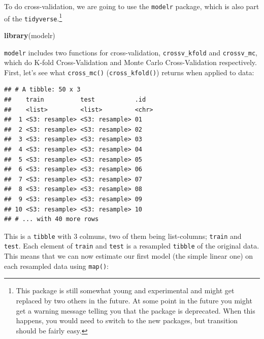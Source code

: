 \documentclass[]{gitbook}
\newenvironment{Shaded}{\begin{snugshade}}{\end{snugshade}}
\newcommand{\DataTypeTok}[1]{\textcolor[rgb]{0.13,0.29,0.53}{#1}}
\newcommand{\DecValTok}[1]{\textcolor[rgb]{0.00,0.00,0.81}{#1}}
\newcommand{\KeywordTok}[1]{\textcolor[rgb]{0.13,0.29,0.53}{\textbf{#1}}}
\newcommand{\NormalTok}[1]{#1}
\newcommand{\OperatorTok}[1]{\textcolor[rgb]{0.81,0.36,0.00}{\textbf{#1}}}
\newcommand{\StringTok}[1]{\textcolor[rgb]{0.31,0.60,0.02}{#1}}
\let\rmarkdownfootnote\footnote%
\def\footnote{\protect\rmarkdownfootnote}
\theoremstyle{definition}
\theoremstyle{definition}
\theoremstyle{definition}
\theoremstyle{remark}
\begin{document}
To do cross-validation, we are going to use the \texttt{modelr} package,
which is also part of the \texttt{tidyverse}.\footnote{This package is
  still somewhat young and experimental and might get replaced by two
  others in the future. At some point in the future you might get a
  warning message telling you that the package is deprecated. When this
  happens, you would need to switch to the new packages, but transition
  should be fairly easy.}

\begin{Shaded}
\begin{Highlighting}[]
\KeywordTok{library}\NormalTok{(modelr)}
\end{Highlighting}
\end{Shaded}

\texttt{modelr} includes two functions for cross-validation,
\texttt{crossv\_kfold} and \texttt{crossv\_mc}, which do K-fold
Cross-Validation and Monte Carlo Cross-Validation respectively. First,
let's see what \texttt{cross\_mc()} (\texttt{cross\_kfold()}) returns
when applied to data:

\begin{Shaded}
\end{Shaded}

\begin{verbatim}
## # A tibble: 50 x 3
##    train          test           .id  
##    <list>         <list>         <chr>
##  1 <S3: resample> <S3: resample> 01   
##  2 <S3: resample> <S3: resample> 02   
##  3 <S3: resample> <S3: resample> 03   
##  4 <S3: resample> <S3: resample> 04   
##  5 <S3: resample> <S3: resample> 05   
##  6 <S3: resample> <S3: resample> 06   
##  7 <S3: resample> <S3: resample> 07   
##  8 <S3: resample> <S3: resample> 08   
##  9 <S3: resample> <S3: resample> 09   
## 10 <S3: resample> <S3: resample> 10   
## # ... with 40 more rows
\end{verbatim}

This is a \texttt{tibble} with 3 colmuns, two of them being
list-columns; \texttt{train} and \texttt{test}. Each element of
\texttt{train} and \texttt{test} is a resampled \texttt{tibble} of the
original data. This means that we can now estimate our first model (the
simple linear one) on each resampled data using \texttt{map()}:
\end{document}
